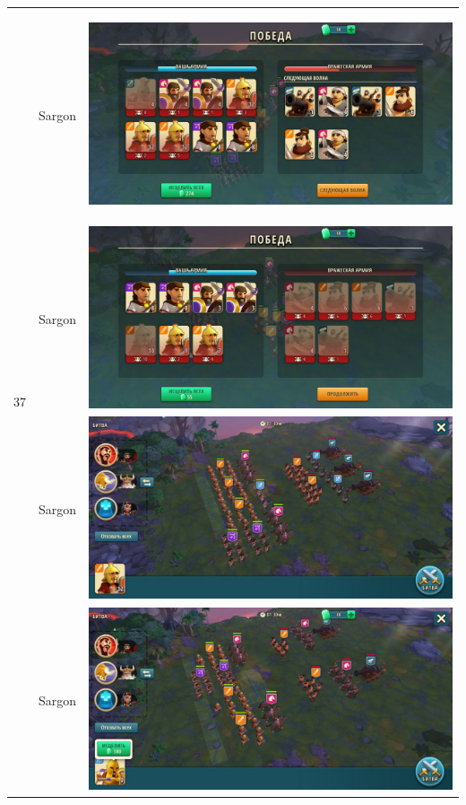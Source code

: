 \begin{longtable}{|c|c|c|}
    \hline
    \multirow{4}{*}{37} & Sargon &
    \hypertarget{fight37}{\includegraphics[width=0.75\linewidth]{./parts/media/TreasureHunt/37/sargon/photo_2022-04-07_13-16-57.jpg}} \\
    & Sargon &
    \includegraphics[width=0.75\linewidth]{./parts/media/TreasureHunt/37/sargon/photo_2022-04-07_13-17-09.jpg} \\
    & Sargon &
    \includegraphics[width=0.75\linewidth]{./parts/media/TreasureHunt/37/sargon/photo_2022-04-07_13-16-49.jpg} \\
    & Sargon &
    \includegraphics[width=0.75\linewidth]{./parts/media/TreasureHunt/37/sargon/photo_2022-04-07_13-17-01.jpg} \\

\end{longtable}
